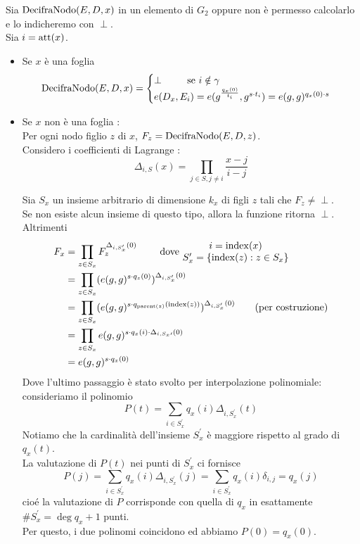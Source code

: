\begin{description}
Sia $\operatorname{DecifraNodo}( E , D , x )$ in un elemento di $G_2$ oppure non è permesso calcolarlo e lo indicheremo con $\perp$.\\
Sia $i = \operatorname{att}(x)$.
\begin{itemize}
\item Se $x$ è una foglia
\[ \operatorname{DecifraNodo}(E,D,x) = \begin{cases}
\perp \qquad \text{ se } i \notin \gamma\\
e(D_x,E_i) = e(g^{\frac{q_x(0)}{t_i}},g^{s\cdot t_i}) = e(g,g)^{q_x(0) \cdot s}
\end{cases} \]
\item Se $x$ non è una foglia :\\
Per ogni nodo figlio $z$ di $x$, $F_z = \operatorname{DecifraNodo}(E,D,z)$.\\
Considero i coefficienti di Lagrange :
\[ \Delta_{i,S}(x) = \prod_{j \in S , j \neq i} \frac{x-j}{i-j} \]

Sia $S_x$\label{insiemedecript} un insieme arbitrario di dimensione $k_x$ di figli $z$ tali che $F_z \neq \perp$.\\
Se non esiste alcun insieme di questo tipo, allora la funzione ritorna $\perp$. Altrimenti
\begin{align*}
F_x &= \prod_{z \in S_x} F_z^{\Delta_{i,S_x^\prime}(0)} \qquad \text{ dove }
\begin{matrix}
i = \operatorname{index}(x)\\
S^\prime_x = \{ \operatorname{index}(z) : z \in S_x \}
\end{matrix}\\
&= \prod_{z \in S_x} (e(g,g)^{s \cdot q_z(0)})^{\Delta_{i,S_x^\prime}(0)}\\
&= \prod_{z \in S_x} (e(g,g)^{s \cdot q_{\operatorname{parent}(z)}(\operatorname{index}(z))})^{\Delta_{i,S_x^\prime}(0)} \qquad \text{(per costruzione)}\\
&= \prod_{z \in S_x} e(g,g)^{s \cdot q_x(i) \cdot \Delta_{i,S_x\prime}(0)}\\
&= e(g,g)^{s \cdot q_x(0)} 
\end{align*}
Dove l'ultimo passaggio è stato svolto per interpolazione polinomiale:\\
consideriamo il polinomio
\[ P(t) = \sum_{i \in S^\prime_x} q_x(i) \Delta_{i,S^\prime_x}(t)\]
Notiamo che la cardinalità dell'insieme $ S^\prime_x$ è maggiore rispetto al grado di $q_x(t)$.\\
La valutazione di $P(t)$ nei punti di $S^\prime_x$ ci fornisce 
\[P(j) = \sum_{i \in S^\prime_x} q_x(i) \Delta_{i,S^\prime_x}(j) = \sum_{i \in S^\prime_x} q_x(i) \delta_{i,j} = q_x(j)\]
cioé la valutazione di $P$ corrisponde con quella di $q_x$ in esattamente $\# S^\prime_x = \deg q_x + 1$ punti.\\
Per questo, i due polinomi coincidono ed abbiamo $P(0) = q_x(0)$.


\end{itemize}
\end{description}
